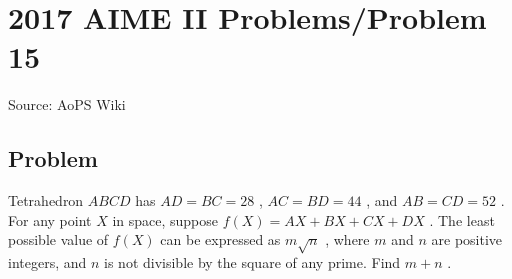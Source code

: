 \documentclass[12pt]{article}
\begin{document}
\section*{{2017 AIME II Problems/Problem 15}}
Source: AoPS Wiki

\subsection*{Problem}
Tetrahedron $ABCD$ has $AD=BC=28$ , $AC=BD=44$ , and $AB=CD=52$ . For any point $X$ in space, suppose $f(X)=AX+BX+CX+DX$ . The least possible value of $f(X)$ can be expressed as $m\sqrt{n}$ , where $m$ and $n$ are positive integers, and $n$ is not divisible by the square of any prime. Find $m+n$ .
\end{document}
